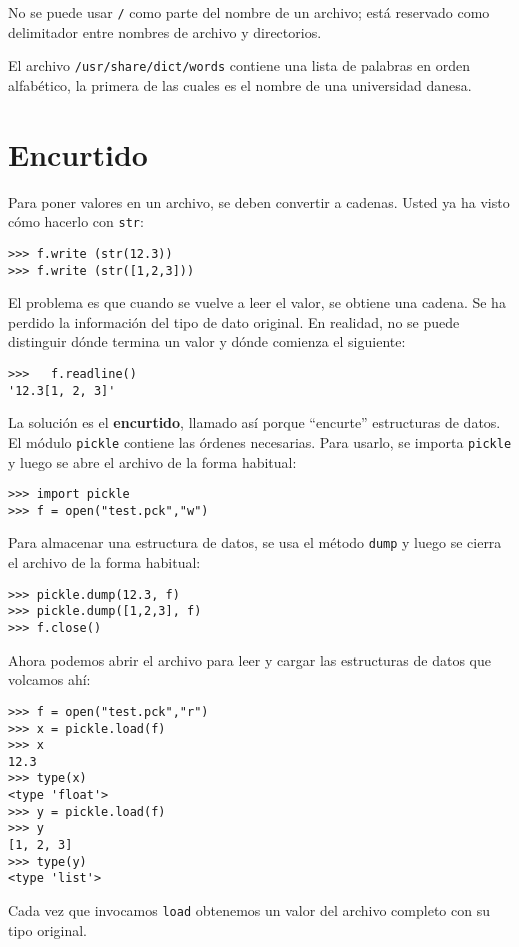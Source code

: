  

No se puede usar \texttt{/} como parte del nombre de un archivo; está
reservado como delimitador entre nombres de archivo y directorios.

El archivo \texttt{/usr/share/dict/words} contiene una lista de palabras
en orden alfabético, la primera de las cuales es el nombre de una
universidad danesa.

\section{Encurtido}


Para poner valores en un archivo, se deben convertir a cadenas. Usted
ya ha visto cómo hacerlo con \texttt{str}:
\begin{lstlisting}
>>> f.write (str(12.3))
>>> f.write (str([1,2,3]))
\end{lstlisting}
 El problema es que cuando se vuelve a leer el valor, se obtiene una
cadena. Se ha perdido la información del tipo de dato original. En
realidad, no se puede distinguir dónde termina un valor y dónde comienza
el siguiente:

\begin{lstlisting}
>>>   f.readline()
'12.3[1, 2, 3]'
\end{lstlisting}
 La solución es el \textbf{encurtido}, llamado así porque ``encurte''
estructuras de datos. El módulo \texttt{pickle} contiene las órdenes
necesarias. Para usarlo, se importa \texttt{pickle} y luego se abre
el archivo de la forma habitual:
\begin{lstlisting}
>>> import pickle
>>> f = open("test.pck","w")
\end{lstlisting}

Para almacenar una estructura de datos, se usa el método \texttt{dump}
y luego se cierra el archivo de la forma habitual:
\begin{lstlisting}
>>> pickle.dump(12.3, f)
>>> pickle.dump([1,2,3], f)
>>> f.close()
\end{lstlisting}

Ahora podemos abrir el archivo para leer y cargar las estructuras
de datos que volcamos ahí:

\begin{lstlisting}
>>> f = open("test.pck","r")
>>> x = pickle.load(f)
>>> x
12.3
>>> type(x)
<type 'float'>
>>> y = pickle.load(f)
>>> y
[1, 2, 3]
>>> type(y)
<type 'list'>
\end{lstlisting}
 Cada vez que invocamos \texttt{load} obtenemos un valor del archivo
completo con su tipo original.

